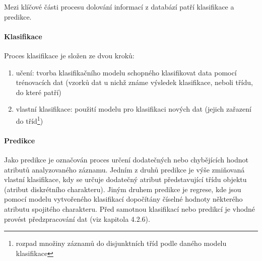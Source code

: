 \documentclass[12pt]{article}
\begin{document}
Mezi klíčové části procesu dolování informací z databází patří klasifikace a predikce.
\paragraph{Klasifikace}
\leavevmode
\newline
Proces klasifikace je složen ze dvou kroků:
\begin{enumerate}
\item učení: tvorba klasifikačního modelu schopného klasifikovat data pomocí trénovacích dat
(vzorků dat u nichž známe výsledek klasifikace, neboli třídu, do které patří)
\item vlastní klasifikace: použití modelu pro klasifikaci nových dat (jejich zařazení do tříd\footnote{rozpad množiny záznamů do disjunktních tříd podle daného modelu klasifikace})
\end{enumerate}
\paragraph{Predikce}
\leavevmode
\newline
Jako predikce je označován proces určení dodatečných nebo chybějících hodnot
atributů analyzovaného záznamu. Jedním z druhů predikce je výše zmiňovaná vlastní klasifikace,
kdy se určuje dodatečný atribut představující třídu objektu (atribut diskrétního charakteru).
Jiným druhem predikce je regrese, kde jsou pomocí modelu vytvořeného klasifikací dopočítány
číselné hodnoty některého atributu spojitého charakteru.
\newline
Před samotnou klasifikací nebo predikcí je vhodné provést předzpracování dat (viz kapitola 4.2.6).
\end{document}
